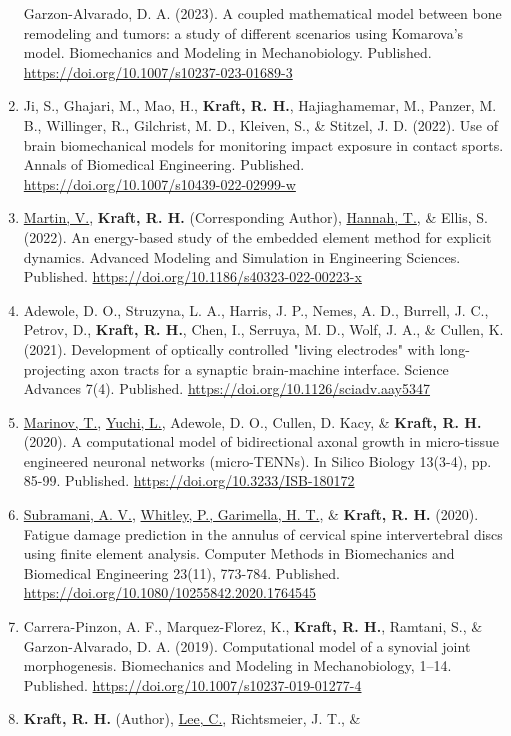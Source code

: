 \documentclass[a4paper,10pt]{article}
\begin{document}
\begin{enumerate}
 Garzon-Alvarado, D. A. (2023). A coupled mathematical model between bone remodeling and tumors: a study of different scenarios using Komarova's model. Biomechanics and Modeling in Mechanobiology. Published. \url{https://doi.org/10.1007/s10237-023-01689-3}
 \item	Ji, S., Ghajari, M., Mao, H., \textbf{\textbf{Kraft,} R. H.}, Hajiaghamemar, M., Panzer, M. B., Willinger, R., Gilchrist, M. D., Kleiven, S., \&
 Stitzel, J. D. (2022). Use of brain biomechanical models for monitoring impact exposure in contact sports. Annals of Biomedical Engineering. Published. \url{https://doi.org/10.1007/s10439-022-02999-w}
 \item	\underline{Martin, V.}, \textbf{\textbf{Kraft,} R. H.} (Corresponding Author), \underline{Hannah, T.}, \&
 Ellis, S. (2022). An energy-based study of the embedded element method for explicit dynamics. Advanced Modeling and Simulation in Engineering Sciences. Published. \url{https://doi.org/10.1186/s40323-022-00223-x}
 \item	Adewole, D. O., Struzyna, L. A., Harris, J. P., Nemes, A. D., Burrell, J. C., Petrov, D., \textbf{\textbf{Kraft,} R. H.}, Chen, I., Serruya, M. D., Wolf, J. A., \&
 Cullen, K. (2021). Development of optically controlled "living electrodes" with long-projecting axon tracts for a synaptic brain-machine interface. Science Advances 7(4). Published. \url{https://doi.org/10.1126/sciadv.aay5347}
 \item	\underline{Marinov, T.}, \underline{Yuchi, L.}, Adewole, D. O., Cullen, D. Kacy, \&
 \textbf{\textbf{Kraft,} R. H.} (2020). A computational model of bidirectional axonal growth in micro-tissue engineered neuronal networks (micro-TENNs). In Silico Biology 13(3-4), pp. 85-99. Published. \url{https://doi.org/10.3233/ISB-180172}
 \item	\underline{Subramani, A. V.}, \underline{Whitley, P., Garimella, H. T.}, \&
 \textbf{\textbf{Kraft,} R. H.} (2020). Fatigue damage prediction in the annulus of cervical spine intervertebral discs using finite element analysis. Computer Methods in Biomechanics and Biomedical Engineering 23(11), 773-784. Published. \url{https://doi.org/10.1080/10255842.2020.1764545}
 \item	Carrera-Pinzon, A. F., Marquez-Florez, K., \textbf{\textbf{Kraft,} R. H.}, Ramtani, S., \&
 Garzon-Alvarado, D. A. (2019). Computational model of a synovial joint morphogenesis. Biomechanics and Modeling in Mechanobiology, 1--14. Published. \url{https://doi.org/10.1007/s10237-019-01277-4}
 \item	\textbf{\textbf{Kraft,} R. H.} (Author), \underline{Lee, C.}, Richtsmeier, J. T., \&

\end{enumerate}
\end{document}
